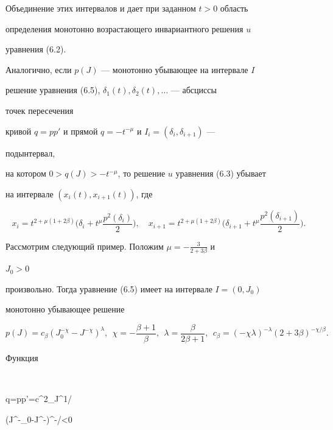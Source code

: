 Объединение этих интервалов и дает при заданном $t>0$ область  


определения монотонно возрастающего инвариантного решения $u$  


уравнения (6.2). 


 


Аналогично, если $p(J)$ --- монотонно убывающее на интервале $I$  


решение уравнения (6.5), $\delta_1(t),\delta_2(t),\dotsc$ --- абсциссы 


точек пересечения  


кривой $q=pp'$ и прямой $q=-t^{-\mu}$ и $I_i=(\delta_i,\delta_{i+1})$ --- 


подынтервал, 


на котором $0>q(J)>-t^{-\mu}$, то решение $u$ уравнения (6.3) убывает  


на интервале $(x_i(t),x_{i+1}(t))$, где 


\begin{equation} 


x_i=t^{2+\mu(1+2\beta)}\bigg(\delta_i+t^\mu 


\frac{p^2(\delta_i)}{2}\bigg),\quad 


x_{i+1}=t^{2+\mu(1+2\beta)}\bigg(\delta_{i+1}+t^\mu 


\frac{p^2(\delta_{i+1})}{2}\bigg). 


\end{equation} 


 


Рассмотрим следующий пример. Положим $\mu=-\frac{3}{2+3\beta}$ и 


$J_0>0$ 


произвольно. Тогда уравнение (6.5) имеет на интервале $I=(0,J_0)$ 


монотонно убывающее решение 


$$ 


p(J)=c_\beta(J^{-\chi}_0-J^{-\chi})^\lambda,\ \  


\chi=-\frac{\beta+1}{\beta},\ \ \lambda=\frac{\beta}{2\beta+1}, 


\ \ c_\beta=(-\chi\lambda)^{-\lambda}(2+3\beta)^{-\chi/\beta}. 


$$ 


Функция 


$$ 


q=pp'=\chi\lambda c^2_\beta J^{1/\beta} 


(J^{-\chi}_0-J^{-\chi})^{-\lambda/\beta}<0 


